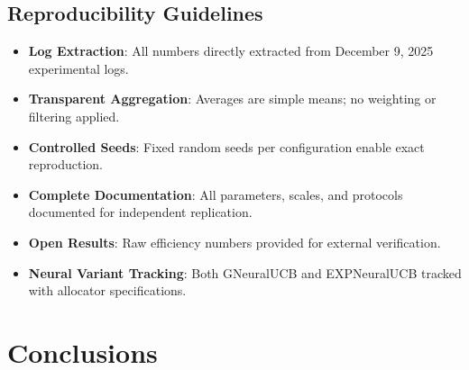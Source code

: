 \documentclass[12pt,a4paper]{article}
\begin{document}
\subsection{Reproducibility Guidelines}
\begin{itemize}
\item \textbf{Log Extraction}: All numbers directly extracted from December 9, 2025 experimental logs.
\item \textbf{Transparent Aggregation}: Averages are simple means; no weighting or filtering applied.
\item \textbf{Controlled Seeds}: Fixed random seeds per configuration enable exact reproduction.
\item \textbf{Complete Documentation}: All parameters, scales, and protocols documented for independent replication.
\item \textbf{Open Results}: Raw efficiency numbers provided for external verification.
\item \textbf{Neural Variant Tracking}: Both GNeuralUCB and EXPNeuralUCB tracked with allocator specifications.
\end{itemize}

\newpage
\section{Conclusions}
\end{document}
